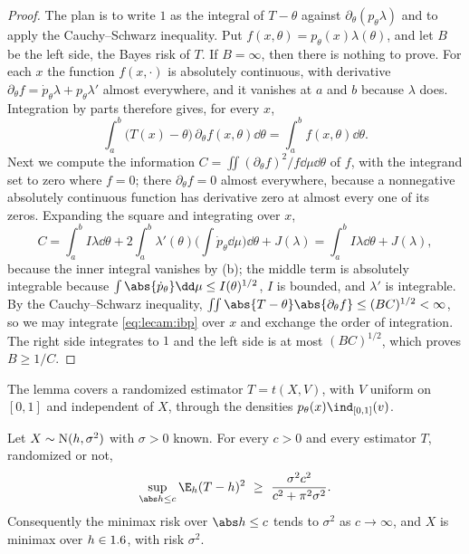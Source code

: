 \begin{refsection}
\begin{proof}
The plan is to write $1$ as the integral of $T-\theta$ against $\partial_\theta(p_\theta\lambda)$ and to apply the Cauchy--Schwarz inequality. Put $f(x,\theta)=p_\theta(x)\lambda(\theta)$, and let $B$ be the left side, the Bayes risk of $T$. If $B=\infty$, then there is nothing to prove. For each $x$ the function $f(x,\cdot)$ is absolutely continuous, with derivative $\partial_\theta f=\dot p_\theta\lambda+p_\theta\lambda'$ almost everywhere, and it vanishes at $a$ and $b$ because $\lambda$ does. Integration by parts therefore gives, for every $x$,
\begin{equation}\label{eq:lecam:ibp}
  \int_a^b\big(T(x)-\theta\big)\,\partial_\theta f(x,\theta)\dd\theta=\int_a^bf(x,\theta)\dd\theta.
\end{equation}
Next we compute the information $C=\iint(\partial_\theta f)^2/f\dd\mu\dd\theta$ of $f$, with the integrand set to zero where $f=0$; there $\partial_\theta f=0$ almost everywhere, because a nonnegative absolutely continuous function has derivative zero at almost every one of its zeros. Expanding the square and integrating over $x$,
\[
  C=\int_a^bI\lambda\dd\theta+2\int_a^b\lambda'(\theta)\Big(\int\dot p_\theta\dd\mu\Big)\dd\theta+J(\lambda)=\int_a^bI\lambda\dd\theta+J(\lambda),
\]
because the inner integral vanishes by (b); the middle term is absolutely integrable because $\int\abs{\dot p_\theta}\dd\mu\le I(\theta)^{1/2}$, $I$ is bounded, and $\lambda'$ is integrable. By the Cauchy--Schwarz inequality, $\iint\abs{T-\theta}\abs{\partial_\theta f}\le(BC)^{1/2}<\infty$, so we may integrate \eqref{eq:lecam:ibp} over $x$ and exchange the order of integration. The right side integrates to $1$ and the left side is at most $(BC)^{1/2}$, which proves $B\ge1/C$.
\end{proof}

The lemma covers a randomized estimator $T=t(X,V)$, with $V$ uniform on $[0,1]$ and independent of $X$, through the densities $p_\theta(x)\ind_{[0,1]}(v)$.

\begin{theorem}\label{thm:lecam:gaussian-minimax}
Let $X\sim\mathrm{N}(h,\sigma^2)$ with $\sigma>0$ known. For every $c>0$ and every estimator $T$, randomized or not,
\[
  \sup_{\abs h\le c}\E_h(T-h)^2\ \ge\ \frac{\sigma^2c^2}{c^2+\pi^2\sigma^2}.
\]
Consequently the minimax risk over $\abs h\le c$ tends to $\sigma^2$ as $c\to\infty$, and $X$ is minimax over $h\in1.6$, with risk $\sigma^2$.
\end{theorem}


\end{refsection}
